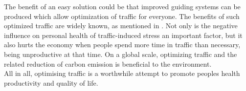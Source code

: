 \documentclass[a4paper,hidelinks]{article}
\begin{document}
The benefit of an easy solution could be that improved guiding systems can be produced which allow optimization of traffic for everyone. The benefits of such optimized traffic are widely known, as mentioned in \cite{france2003multiagent}. Not only is the negative influence on personal health of traffic-induced stress an important factor, but it also hurts the economy when people spend more time in traffic than necessary, being unproductive at that time. On a global scale, optimizing traffic and the related reduction of carbon emission is beneficial to the environment. \\
All in all, optimising traffic is a worthwhile attempt to promote peoples health productivity and quality of life. 




\end{document}
